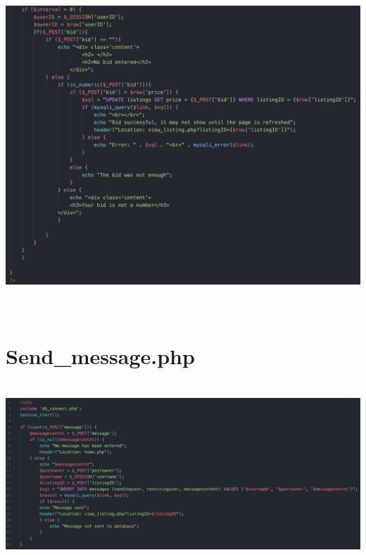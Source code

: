 \includegraphics[width=6.26806in,height=4.92222in]{ch6_appendix/media/image19.png}

\section*{Send\_message.php}

\includegraphics[width=6.26806in,height=2.675in]{ch6_appendix/media/image20.png}


